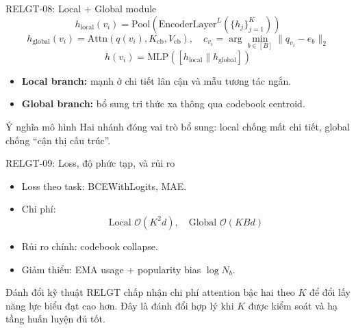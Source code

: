\documentclass[aspectratio=169,11pt]{beamer}
\begin{document}
\begin{frame}{RELGT-08: Local + Global module}
  \[
    h_\text{local}(v_i)=\text{Pool}\left(\text{EncoderLayer}^{L}(\{h_j\}_{j=1}^{K})\right)
  \]
  \[
    h_\text{global}(v_i)=\text{Attn}(q(v_i),K_\text{cb},V_\text{cb}),\quad
    c_{v_i}=\arg\min_{b\in[B]}\|q_{v_i}-e_b\|_2
  \]
  \[
    h(v_i)=\text{MLP}\left([h_\text{local}\|h_\text{global}]\right)
  \]
\begin{itemize}
  \item \textbf{Local branch:} mạnh ở chi tiết lân cận và mẫu tương tác ngắn.
  \item \textbf{Global branch:} bổ sung tri thức xa thông qua codebook centroid.
\end{itemize}
\begin{exampleblock}{Ý nghĩa mô hình}
  Hai nhánh đóng vai trò bổ sung: local chống mất chi tiết, global chống “cận thị cấu trúc”.
\end{exampleblock}
\end{frame}

\begin{frame}{RELGT-09: Loss, độ phức tạp, và rủi ro}
  \begin{itemize}
    \item Loss theo task: BCEWithLogits, MAE.
    \item Chi phí:
    \[
      \text{Local } \mathcal{O}(K^2d),\quad \text{Global } \mathcal{O}(KBd)
    \]
    \item Rủi ro chính: codebook collapse.
    \item Giảm thiểu: EMA usage + popularity bias $\log N_b$.
  \end{itemize}
\begin{block}{Đánh đổi kỹ thuật}
  RELGT chấp nhận chi phí attention bậc hai theo $K$ để đổi lấy năng lực biểu đạt cao hơn. Đây là đánh đổi hợp lý khi $K$ được kiểm soát và hạ tầng huấn luyện đủ tốt.
\end{block}
\end{frame}
\end{document}
